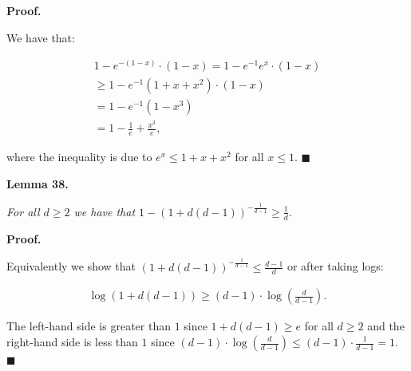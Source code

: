 \documentclass[10pt,a4paper]{article}
\begin{document}



\par\medskip\noindent\textbf{Proof.}\par



We have that:\par


\[\begin{gathered}
\displaystyle 1-e^{-(1-x)}\cdot(1-x) \displaystyle=1-e^{-1}e^{x}\cdot(1-x) \\
\displaystyle\geq 1-e^{-1}(1+x+x^{2})\cdot(1-x) \\
\displaystyle=1-e^{-1}(1-x^{3}) \\
\displaystyle=1-\frac{1}{e}+\frac{x^{3}}{e},
\end{gathered}\]


where the inequality is due to $e^{x}\leq 1+x+x^{2}$ for all $x\leq 1$.
\ensuremath{\blacksquare}\par






\par\medskip\noindent\textbf{\textbf{Lemma 38}\textbf{.}}\par



\emph{For all $d\geq 2$ we have that $1-\left(1+d(d-1)\right)^{-\frac{1}{d-1}}\geq\frac{1}{d}$.}\par






\par\medskip\noindent\textbf{Proof.}\par



Equivalently we show that $\left(1+d(d-1)\right)^{-\frac{1}{d-1}}\leq\frac{d-1}{d}$ or after taking logs:\par


\[\begin{gathered}
\displaystyle\log\left(1+d(d-1)\right)\geq(d-1)\cdot\log\left(\frac{d}{d-1}\right).
\end{gathered}\]


The left-hand side is greater than $1$ since $1+d(d-1)\geq e$ for all $d\geq 2$ and the right-hand side is less than $1$ since $(d-1)\cdot\log\left(\frac{d}{d-1}\right)\leq(d-1)\cdot\frac{1}{d-1}=1$.
\ensuremath{\blacksquare}\par
\end{document}
